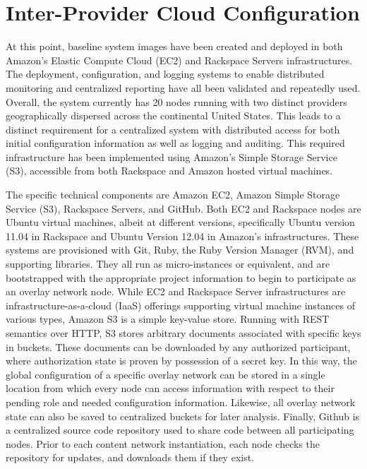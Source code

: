 \section{Inter-Provider Cloud Configuration}
At this point, baseline system images have been created and deployed in both Amazon's Elastic Compute Cloud (EC2) and Rackspace Servers infrastructures.  The deployment, configuration, and logging systems to enable distributed monitoring and centralized reporting have all been validated and repeatedly used.  Overall, the system currently has 20 nodes running with two distinct providers geographically dispersed across the continental United States.  This leads to a distinct requirement for a centralized system with distributed access for both initial configuration information as well as logging and auditing.  This required infrastructure has been implemented using Amazon's Simple Storage Service (S3), accessible from both Rackspace and Amazon hosted virtual machines.

The specific technical components are Amazon EC2, Amazon Simple Storage Service (S3), Rackspace Servers, and GitHub.  Both EC2 and Rackspace nodes are Ubuntu virtual machines, albeit at different versions, specifically Ubuntu version 11.04 in Rackspace and Ubuntu Version 12.04 in Amazon's infrastructures.  These systems are provisioned with Git, Ruby, the Ruby Version Manager (RVM), and supporting libraries.  They all run as micro-instances or equivalent, and are bootstrapped with the appropriate project information to begin to participate as an overlay network node.  While EC2 and Rackspace Server infrastructures are infrastructure-as-a-cloud (IaaS) offerings supporting virtual machine instances of various types, Amazon S3 is a simple key-value store.  Running with REST semantics over HTTP, S3 stores arbitrary documents associated with specific keys in buckets.  These documents can be downloaded by any authorized participant, where authorization state is proven by possession of a secret key.  In this way, the global configuration of a specific overlay network can be stored in a single location from which every node can access information with respect to their pending role and needed configuration information.  Likewise, all overlay network state can also be saved to centralized buckets for later analysis.  Finally, Github is a centralized source code repository used to share code between all participating nodes.  Prior to each content network instantiation, each node checks the repository for updates, and downloads them if they exist.

